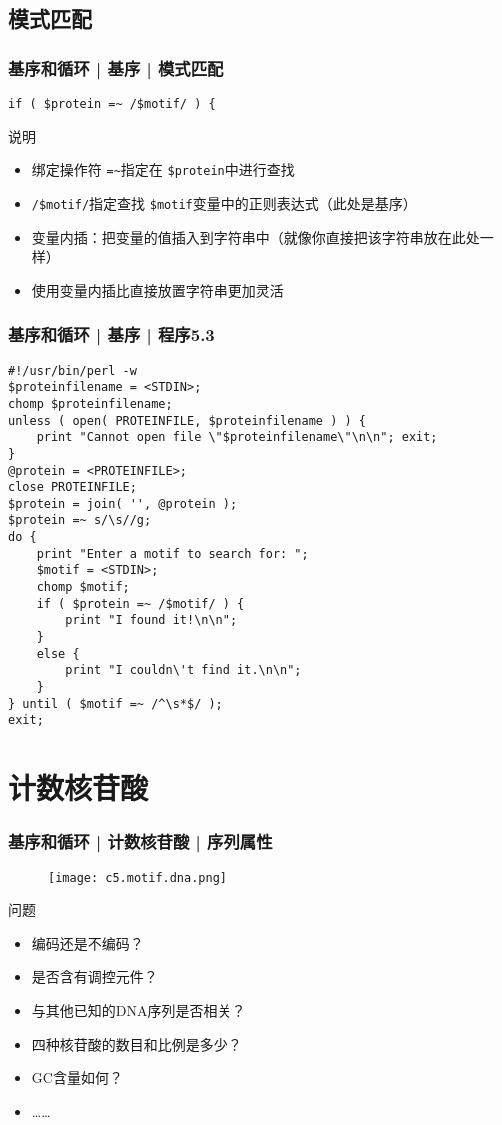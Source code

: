 \subsection{模式匹配}
\begin{frame}[fragile]
  \frametitle{基序和循环 | 基序 | \alert{模式匹配}}
\begin{lstlisting}
if ( $protein =~ /$motif/ ) {
\end{lstlisting}
\pause
\begin{block}{说明}
  \begin{itemize}
    \item 绑定操作符 \verb|=~|指定在 \verb|$protein|中进行查找
    \item \verb|/$motif/|指定查找 \verb|$motif|变量中的正则表达式（此处是基序）
    \item 变量内插：把变量的值插入到字符串中（就像你直接把该字符串放在此处一样）
    \item 使用变量内插比直接放置字符串更加灵活
  \end{itemize}
\end{block}
\end{frame}

\begin{frame}[fragile]
  \frametitle{基序和循环 | 基序 | \alert{程序5.3}}
\begin{lstlisting}[basicstyle=\scriptsize\tt,numberstyle=\tiny]
#!/usr/bin/perl -w
$proteinfilename = <STDIN>;
chomp $proteinfilename;
unless ( open( PROTEINFILE, $proteinfilename ) ) {
    print "Cannot open file \"$proteinfilename\"\n\n"; exit;
}
@protein = <PROTEINFILE>;
close PROTEINFILE;
$protein = join( '', @protein );
$protein =~ s/\s//g;
do {
    print "Enter a motif to search for: ";
    $motif = <STDIN>;
    chomp $motif;
    if ( $protein =~ /$motif/ ) {
        print "I found it!\n\n";
    }
    else {
        print "I couldn\'t find it.\n\n";
    }
} until ( $motif =~ /^\s*$/ );
exit;
\end{lstlisting}
\end{frame}

\section{计数核苷酸}
\begin{frame}
  \frametitle{基序和循环 | 计数核苷酸 | 序列属性}
  \begin{figure}
    \centering
    \texttt{[image: c5.motif.dna.png]}
  \end{figure}
  \pause
  \begin{block}{问题}
    \begin{itemize}
      \item 编码还是不编码？
      \item 是否含有调控元件？
      \item 与其他已知的DNA序列是否相关？
      \item 四种核苷酸的数目和比例是多少？
      \item GC含量如何？
      \item ……
    \end{itemize}
  \end{block}
\end{frame}

